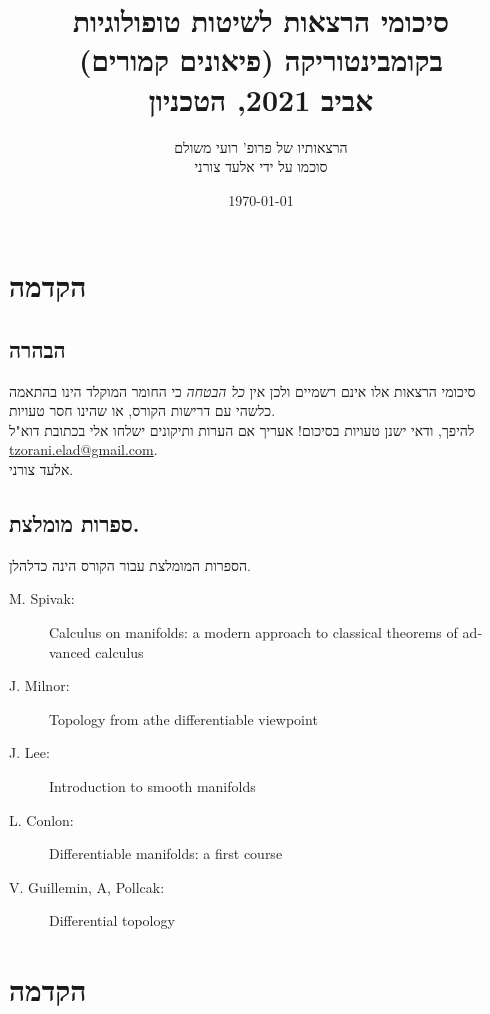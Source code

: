 \documentclass[a4paper,10pt,twoside,openany]{book}
\title{סיכומי הרצאות לשיטות טופולוגיות בקומבינטוריקה (פיאונים קמורים) \\ \large{אביב 2021, הטכניון}}
\author{הרצאותיו של פרופ' רועי משולם \\ \large סוכמו על ידי אלעד צורני}
\date{\today}
\begin{document}
\frontmatter
{}
\tableofcontents
\countlectures
\newpage

\chapter*{הקדמה}
 

\section*{הבהרה}

סיכומי הרצאות אלו אינם רשמיים ולכן אין
\emph{כל הבטחה}
כי החומר המוקלד הינו בהתאמה כלשהי עם דרישות הקורס, או שהינו חסר טעויות.
\\
להיפך, ודאי ישנן טעויות בסיכום! אעריך אם הערות ותיקונים ישלחו אלי בכתובת דוא"ל
\textenglish{\href{mailto:tzorani.elad@gmail.com}{tzorani.elad@gmail.com}}.\\
אלעד צורני.

\section*{ספרות מומלצת.} %

הספרות המומלצת עבור הקורס הינה כדלהלן.

\begin{english}
\begin{description}
\item[M. Spivak:] Calculus on manifolds: a modern approach to classical theorems of advanced calculus

\item[J. Milnor:] Topology from athe differentiable viewpoint

\item[J. Lee:] Introduction to smooth manifolds

\item[L. Conlon:] Differentiable manifolds: a first course

\item[V. Guillemin, A, Pollcak:] Differential topology
\end{description}
\end{english}

\mainmatter

\chapter*{הקדמה}
\end{document}
